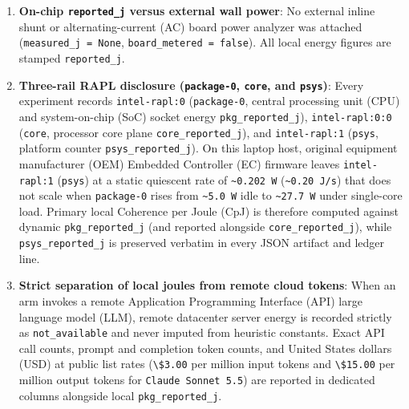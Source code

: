 \documentclass[10pt,letterpaper]{article}
\providecommand{\tightlist}{\setlength{\itemsep}{1pt}\setlength{\parskip}{0pt}}
\begin{document}
\begin{enumerate}
\def\labelenumi{\arabic{enumi}.}
\tightlist
\item
  \textbf{On-chip \texttt{reported\_\allowbreak{}j} versus external wall power}: No
  external inline shunt or alternating-current (AC) board power analyzer
  was attached (\texttt{measured\_\allowbreak{}j\ =\ None},
  \texttt{board\_\allowbreak{}metered\ =\ false}). All local energy figures are
  stamped \texttt{reported\_\allowbreak{}j}.
\item
  \textbf{Three-rail RAPL disclosure (\texttt{package-0}, \texttt{core},
  and \texttt{psys})}: Every experiment records \texttt{intel-\allowbreak{}rapl:0}
  (\texttt{package-0}, central processing unit (CPU) and system-on-chip
  (SoC) socket energy \texttt{pkg\_\allowbreak{}reported\_\allowbreak{}j}),
  \texttt{intel-\allowbreak{}rapl:0:0} (\texttt{core}, processor core plane
  \texttt{core\_\allowbreak{}reported\_\allowbreak{}j}), and \texttt{intel-\allowbreak{}rapl:1} (\texttt{psys},
  platform counter \texttt{psys\_\allowbreak{}reported\_\allowbreak{}j}). On this laptop host,
  original equipment manufacturer (OEM) Embedded Controller (EC)
  firmware leaves \texttt{intel-\allowbreak{}rapl:1} (\texttt{psys}) at a static
  quiescent rate of \texttt{\textasciitilde{}0.202\ W}
  (\texttt{\textasciitilde{}0.20\ J/s}) that does not scale when
  \texttt{package-0} rises from \texttt{\textasciitilde{}5.0\ W} idle to
  \texttt{\textasciitilde{}27.7\ W} under single-core load. Primary
  local Coherence per Joule (CpJ) is therefore computed against dynamic
  \texttt{pkg\_\allowbreak{}reported\_\allowbreak{}j} (and reported alongside
  \texttt{core\_\allowbreak{}reported\_\allowbreak{}j}), while \texttt{psys\_\allowbreak{}reported\_\allowbreak{}j} is
  preserved verbatim in every JSON artifact and ledger line.
\item
  \textbf{Strict separation of local joules from remote cloud tokens}:
  When an arm invokes a remote Application Programming Interface (API)
  large language model (LLM), remote datacenter server energy is
  recorded strictly as \texttt{not\_\allowbreak{}available} and never imputed from
  heuristic constants. Exact API call counts, prompt and completion
  token counts, and United States dollars (USD) at public list rates
  (\texttt{\textbackslash{}\$3.00} per million input tokens and
  \texttt{\textbackslash{}\$15.00} per million output tokens for
  \texttt{Claude\ Sonnet\ 5.\allowbreak{}5}) are reported in dedicated columns
  alongside local \texttt{pkg\_\allowbreak{}reported\_\allowbreak{}j}.
\end{enumerate}
\end{document}

